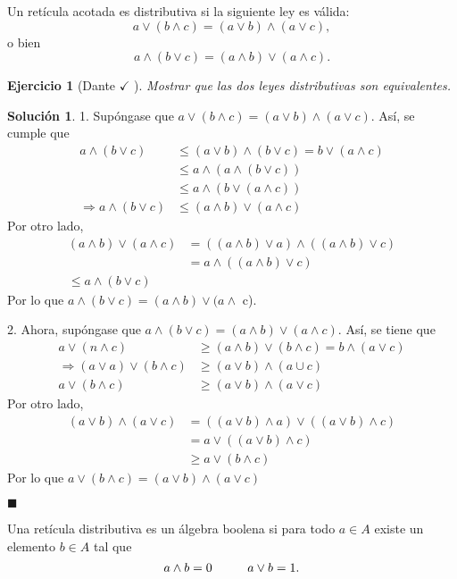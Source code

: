 \documentclass[12pt,letterpaper,titlepage]{article}
\newtheorem{exe}{Ejercicio}
\theoremstyle{definition}
\newtheorem*{sol}{Solución}
\renewcommand\sup{\vee}
\renewcommand\inf{\wedge}
\newcommand\<{\langle}
\renewcommand\>{\rangle}
\begin{document}
Un retícula acotada es distributiva si la siguiente ley es
válida:
\[
  a\sup(b\inf c) = (a\sup b)\inf (a\sup c)
,\]
o bien
\[
  a\inf(b\sup c) = (a\inf b)\sup(a\inf c)
.\]
\begin{exe}[Dante $\checkmark$ ]
  Mostrar que las dos leyes distributivas son equivalentes.
\end{exe}
\begin{sol}
    1. Supóngase que $a\sup(b\inf c)=(a\sup b)\inf(a\sup c)$. Así, se cumple que
    \begin{align*}
        a\inf(b\sup c)&\leq (a\sup b)\inf(b\sup c)=b\sup(a\inf c)\\
        &\leq a\inf(a\inf(b\sup c))\\
        &\leq a\inf(b\sup(a\inf c))\\
        \Rightarrow a\inf(b\sup c)&\leq (a\inf b)\sup(a\inf c)
    \end{align*}
    Por otro lado, 
    \begin{align*}
        (a\inf b)\sup (a\inf c)&=((a\inf b)\sup a)\inf((a\inf b)\sup c)\\
        &=a\inf((a\inf b)\sup c)\\
        \leq a\inf(b\sup c)
    \end{align*}
Por lo que $a\inf(b\sup c)=(a\inf b)\sup(a\inf$ c).\vspace{3mm}

2. Ahora, supóngase que $a\inf(b\sup c)=(a\inf b)\sup(a\inf c) $. Así, se tiene que
\begin{align*}
    a\sup(n\inf c)&\geq(a\inf b)\sup(b\inf c)=b\inf(a\sup c)\\
    \Rightarrow (a\sup a) \sup (b\inf c) &\geq (a\sup b)\inf(a\cup c)\\
    a\sup(b\inf c)&\geq (a\sup b)\inf(a\sup c)
\end{align*}
Por otro lado, 
\begin{align*}
    (a\sup b)\inf(a\sup c)&=((a\sup b)\inf a)\sup((a\sup b)\inf c)\\
    &=a\sup((a\sup b)\inf c)\\
    &\geq a\sup(b\inf c)
\end{align*}
Por lo que $a\sup(b\inf c)=(a\sup b)\inf(a\sup c)$\vspace{2mm}

\hfill $\blacksquare$
\end{sol}
Una retícula distributiva es un álgebra boolena si para todo
$a\in A$ existe un elemento $b\in A$ tal que
\[
  a\inf b = 0 \hspace{10mm} a\sup b = 1
.\]
\end{document}
